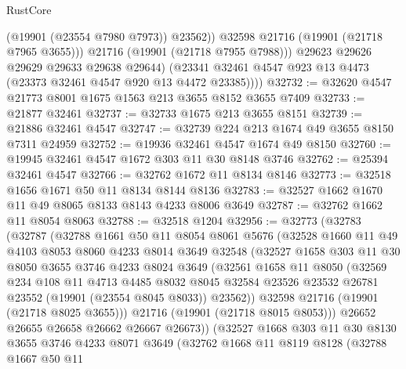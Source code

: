 \begin{lexlean}{RustCore}
\begin{coremodule}
                  (@19901 (@23554 @7980 @7973))
                  @23562))
              @32598
              @21716
              (@19901 (@21718 @7965 @3655)))
            @21716
            (@19901 (@21718 @7955 @7988)))
          @29623
          @29626
          @29629
          @29633
          @29638
          @29644)
        (@23341 @32461 @4547 @923 @13 @4473 (@23373 @32461 @4547 @920 @13 @4472 @23385))))
@32732 := @32620 @4547 @21773 @8001 @1675 @1563 @213 @3655 @8152 @3655 @7409
@32733 := @21877 @32461
@32737 := @32733 @1675 @213 @3655 @8151
@32739 := @21886 @32461 @4547
@32747 := @32739 @224 @213 @1674 @49 @3655 @8150 @7311 @24959
@32752 := @19936 @32461 @4547 @1674 @49 @8150
@32760 := @19945 @32461 @4547 @1672 @303 @11 @30 @8148 @3746
@32762 := @25394 @32461 @4547
@32766 := @32762 @1672 @11 @8134 @8146
@32773 := @32518 @1656 @1671 @50 @11 @8134 @8144 @8136
@32783 := @32527 @1662 @1670 @11 @49 @8065 @8133 @8143 @4233 @8006 @3649
@32787 := @32762 @1662 @11 @8054 @8063
@32788 := @32518 @1204
@32956 := @32773
    (@32783
      (@32787
        (@32788
          @1661
          @50
          @11
          @8054
          @8061
          @5676
          (@32528
            @1660
            @11
            @49
            @4103
            @8053
            @8060
            @4233
            @8014
            @3649
            @32548
            (@32527
              @1658
              @303
              @11
              @30
              @8050
              @3655
              @3746
              @4233
              @8024
              @3649
              (@32561
                @1658
                @11
                @8050
                (@32569
                  @234
                  @108
                  @11
                  @4713
                  @4485
                  @8032
                  @8045
                  @32584
                  @23526
                  @23532
                  @26781
                  @23552
                  (@19901 (@23554 @8045 @8033))
                  @23562))
              @32598
              @21716
              (@19901 (@21718 @8025 @3655)))
            @21716
            (@19901 (@21718 @8015 @8053)))
          @26652
          @26655
          @26658
          @26662
          @26667
          @26673))
      (@32527
        @1668
        @303
        @11
        @30
        @8130
        @3655
        @3746
        @4233
        @8071
        @3649
        (@32762
          @1668
          @11
          @8119
          @8128
          (@32788
            @1667
            @50
            @11

\end{coremodule}
\end{lexlean}
